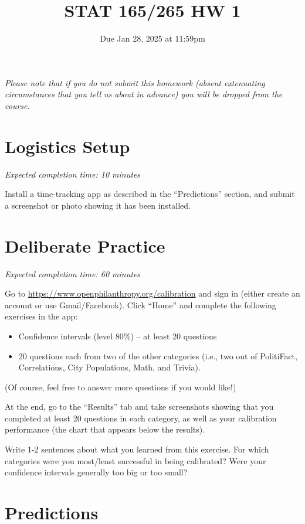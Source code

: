 \documentclass[11pt]{article}
\title{STAT 165/265 HW 1}
\date{Due Jan 28, 2025 at 11:59pm}
\begin{document}
\maketitle

\textit{Please note that if you do not submit this homework (absent extenuating circumstances that you tell us about in advance) you will be dropped from the course.}

\section*{Logistics Setup}

\emph{Expected completion time: 10 minutes}

Install a time-tracking app as described in the ``Predictions'' section, and submit a screenshot or photo showing it has been 
installed.

\section*{Deliberate Practice}

\emph{Expected completion time: 60 minutes}

Go to \url{https://www.openphilanthropy.org/calibration} and sign in (either create an account or use 
Gmail/Facebook). Click ``Home'' and complete the following exercises in the app:

\begin{itemize}

\item Confidence intervals (level 80\%) -- at least 20 questions
\item 20 questions each from two of the other categories (i.e., two out of PolitiFact, Correlations, City Populations, Math, and Trivia).

\end{itemize}

(Of course, feel free to answer more questions if you would like!)

At the end, go to the ``Results'' tab and take screenshots showing that 
you completed at least 20 questions in each category, as well as your calibration 
performance (the chart that appears below the results).

Write 1-2 sentences about what you learned from this exercise. For which categories were you most/least successful in being calibrated? Were your confidence intervals generally too big or too small?

\section*{Predictions}
\end{document}
